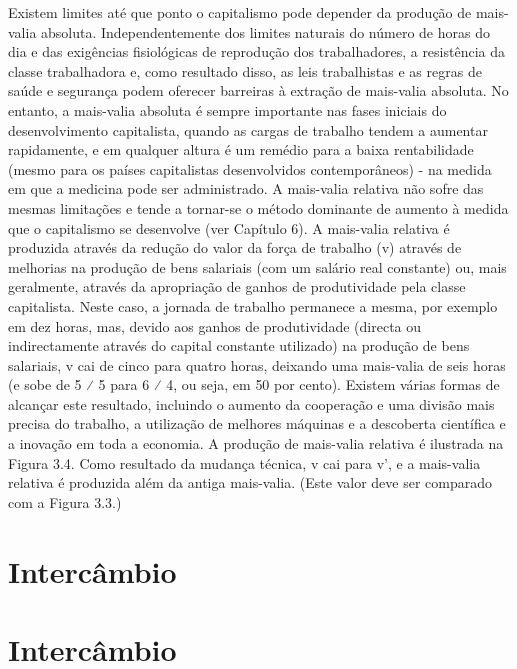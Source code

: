  \par 
Existem limites até que ponto o capitalismo pode depender da produção de mais-valia absoluta. Independentemente dos limites naturais do número de horas do dia e das exigências fisiológicas de reprodução dos trabalhadores, a resistência da classe trabalhadora e, como resultado disso, as leis trabalhistas e as regras de saúde e segurança podem oferecer barreiras à extração de mais-valia absoluta. No entanto, a mais-valia absoluta é sempre importante nas fases iniciais do desenvolvimento capitalista, quando as cargas de trabalho tendem a aumentar rapidamente, e em qualquer altura é um remédio para a baixa rentabilidade (mesmo para os países capitalistas desenvolvidos contemporâneos) - na medida em que a medicina pode ser administrado. A mais-valia relativa não sofre das mesmas limitações e tende a tornar-se o método dominante de aumento à medida que o capitalismo se desenvolve (ver Capítulo {\color{blue}6}). A mais-valia relativa é produzida através da redução do valor da força de trabalho (v) através de melhorias na produção de bens salariais (com um salário real constante) ou, mais geralmente, através da apropriação de ganhos de produtividade pela classe capitalista. Neste caso, a jornada de trabalho permanece a mesma, por exemplo em dez horas, mas, devido aos ganhos de produtividade (directa ou indirectamente através do capital constante utilizado) na produção de bens salariais, v cai de cinco para quatro horas, deixando uma mais-valia de seis horas (e sobe de {\color{blue}5} ⁄ {\color{blue}5} para {\color{blue}6} ⁄ 4, ou seja, em {\color{blue}50} por cento). Existem várias formas de alcançar este resultado, incluindo o aumento da cooperação e uma divisão mais precisa do trabalho, a utilização de melhores máquinas e a descoberta científica e a inovação em toda a economia. A produção de mais-valia relativa é ilustrada na Figura {\color{blue}3}.4. Como resultado da mudança técnica, v cai para v', e a mais-valia relativa é produzida além da antiga mais-valia. (Este valor deve ser comparado com a Figura {\color{blue}3}.3.)
 \par 
\section{Intercâmbio}
 \par 
\section{Intercâmbio}
 \par 
